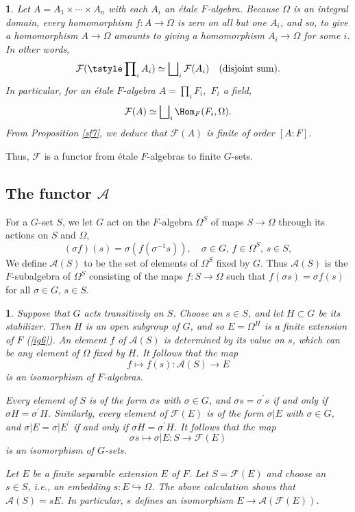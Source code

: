 \documentclass[a4paper,11pt,final,openany]{memoir}
\newtheorem{plain}[X]{}
\theoremstyle{nonumberplain}
\begin{document}
\begin{plain}
\label{b75}Let $A=A_{1}\times\cdots\times A_{n}$ with each $A_{i}$ an
\'{e}tale $F$-algebra. Because $\Omega$ is an integral domain, every
homomorphism $f\colon A\rightarrow\Omega$ is zero on all but one $A_{i}$, and
so, to give a homomorphism $A\rightarrow\Omega$ amounts to giving a
homomorphism $A_{i}\rightarrow\Omega$ for some $i$. In other words,%
\[
\mathcal{F}{}(\tstyle\prod\nolimits_{i}A_{i})\simeq\bigsqcup\nolimits_{i}%
\mathcal{F}{}(A_{i})\quad\text{(disjoint sum).}%
\]
In particular, for an \'{e}tale $F$-algebra $A=\prod\nolimits_{i}F_{i},$
$F_{i}$ a field,%
\[
\mathcal{F}{}(A)\simeq\bigsqcup\nolimits_{i}\Hom_{F}(F_{i},\Omega)\text{.}%
\]
From Proposition \ref{sf7}, we deduce that $\mathcal{F}{}(A)$ is finite of
order $[A\colon F]$.
\end{plain}

Thus, $\mathcal{F}{}$ is a functor from \'{e}tale $F$-algebras to finite $G$-sets.

\subsection{The functor $\mathcal{A}{}$}

For a $G$-set $S$, we let $G$ act on the $F$-algebra $\Omega^{S}$ of maps
$S\rightarrow\Omega$ through its actions on $S$ and $\Omega,$%
\[
(\sigma f)(s)=\sigma(f(\sigma^{-1}s)),\quad\sigma\in G\text{, }f\in\Omega
^{S}\text{, }s\in S,
\]
We define $\mathcal{A}{}(S)$ to be the set of elements of $\Omega^{S}$ fixed
by $G$. Thus $\mathcal{A}{}(S)$ is the $F$-subalgebra of $\Omega^{S}$
consisting of the maps $f\colon S\rightarrow\Omega$ such that $f(\sigma
s)=\sigma f(s)$ for all $\sigma\in G$, $s\in S$.

\begin{plain}
\label{b76}Suppose that $G$ acts transitively on $S$. Choose an $s\in S$, and
let $H\subset G$ be its stabilizer. Then $H$ is an open subgroup of $G$, and
so $E=\Omega^{H}$ is a finite extension of $F$ (\ref{ig6}). An element $f$ of
$\mathcal{A}{}(S)$ is determined by its value on $s$, which can be any element
of $\Omega$ fixed by $H$. It follows that the map
\[
f\mapsto f(s)\colon\mathcal{A}{}(S)\rightarrow E
\]
is an isomorphism of $F$-algebras.

Every element of $S$ is of the form $\sigma s$ with $\sigma\in G$, and $\sigma
s=\sigma^{\prime}s$ if and only if $\sigma H=\sigma^{\prime}H$. Similarly,
every element of $\mathcal{F}{}(E)$ is of the form $\sigma|E$ with $\sigma\in
G$, and $\sigma|E=\sigma|E^{\prime}$ if and only if $\sigma H=\sigma^{\prime
}H$. It follows that the map
\[
\sigma s\mapsto\sigma|E\colon S\rightarrow\mathcal{F}(E)
\]
is an isomorphism of $G$-sets.

Let $E$ be a finite separable extension $E$ of $F$. Let $S=\mathcal{F}{}(E)$
and choose an $s\in S$, i.e., an embedding $s\colon E\hookrightarrow\Omega$.
The above calculation shows that $\mathcal{A}{}(S)=sE$. In particular, $s$
defines an isomorphism $E\rightarrow\mathcal{A}{}(\mathcal{F}{}(E))$.
\end{plain}
\end{document}
